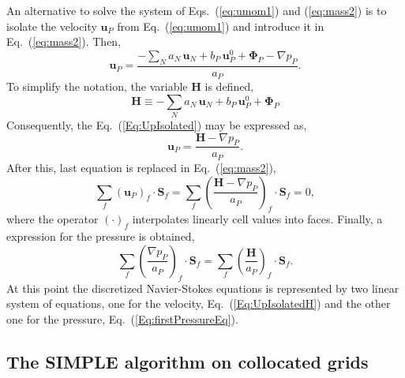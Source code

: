 \documentclass[final,3p,times,11pt,onecolumn]{myElsarticle}
\numberwithin{equation}{section}
\begin{document}
An alternative to solve the system of Eqs.~(\ref{eq:umom1}) and (\ref{eq:mass2}) is to isolate the velocity $\mathbf{u}_{P}$ from Eq.~(\ref{eq:umom1}) and introduce it in Eq.~(\ref{eq:mass2}). Then,
\begin{equation}
\label{Eq:UpIsolated}
\boldsymbol{u}_P
=
\dfrac
{
-\sum_{N} a_{N}\,\boldsymbol{u}_{N}
+
b_P\, \boldsymbol{u}^0_P 
+ 
\boldsymbol{\Phi}_P 
- 
\nabla p_P}
{a_P}.
\end{equation}
To simplify the notation, the variable $\boldsymbol{H}$ is defined,
\begin{equation}
\boldsymbol{H}
\equiv
-\sum_{N} a_{N}\,\boldsymbol{u}_{N}
+
b_P\, \boldsymbol{u}^0_P 
+ 
\boldsymbol{\Phi}_P
\end{equation}
Consequently, the Eq.~(\ref{Eq:UpIsolated}) may be expressed as,
\begin{equation}
\label{Eq:UpIsolatedH}
\boldsymbol{u}_P
=
\dfrac
{
\boldsymbol{H}
- 
\nabla p_P}
{a_P}.
\end{equation}
After this, last equation is replaced in Eq.~(\ref{eq:mass2}),
\begin{equation}
\sum_{f} 
\left(
\boldsymbol{u}_{P} 
\right)_f
\cdotp 
\textbf{S}_{f} 
=
\sum_{f} 
\left(
\dfrac
{
\boldsymbol{H}
- 
\nabla p_P}
{a_P}
\right)_f
\cdotp 
\textbf{S}_{f}
= 
0,
\end{equation}
where the operator $(\cdot)_f$ interpolates linearly cell values into faces. Finally, a expression for the pressure is obtained,
\begin{equation}
\label{Eq:firstPressureEq}
\sum_{f} 
\left(
\dfrac
{
\nabla p_P}
{a_P}
\right)_f
\cdotp 
\textbf{S}_{f}
=
\sum_{f} 
\left(
\dfrac
{
\boldsymbol{H}
}
{a_P}
\right)_f
\cdotp 
\textbf{S}_{f}.
\end{equation}
At this point the discretized Navier-Stokes equations is represented by two linear system of equations, one for the velocity, Eq.~(\ref{Eq:UpIsolatedH}) and the other one for the pressure, Eq.~(\ref{Eq:firstPressureEq}).

\subsection{The SIMPLE algorithm on collocated grids}
\end{document}
